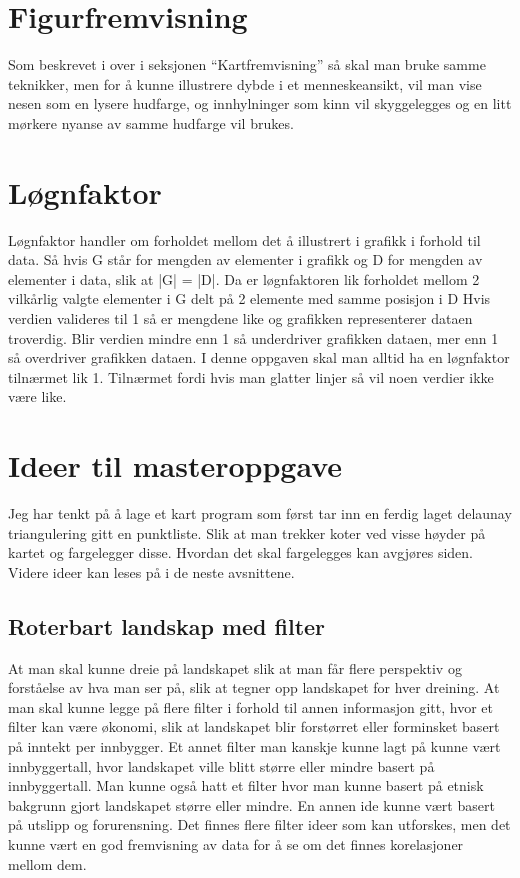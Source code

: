 \documentclass[norsk]{article}
\begin{document}
\section{Figurfremvisning}
Som beskrevet i over i seksjonen ``Kartfremvisning'' så skal man bruke samme
teknikker, men for å kunne illustrere dybde i et menneskeansikt, vil man
vise nesen som en lysere hudfarge, og innhylninger som kinn vil skyggelegges
og en litt mørkere nyanse av samme hudfarge vil brukes.

\section{Løgnfaktor}
Løgnfaktor handler om forholdet mellom det å illustrert i grafikk i forhold til
data. Så hvis G står for mengden av elementer i grafikk og D for mengden av
elementer i data, slik at |G| = |D|. Da er løgnfaktoren lik forholdet mellom
2 vilkårlig valgte elementer i G delt på 2 elemente med samme posisjon i D
Hvis verdien valideres til 1 så er mengdene like og grafikken representerer 
dataen troverdig. Blir verdien mindre enn 1 så underdriver grafikken dataen,
mer enn 1 så overdriver grafikken dataen.
I denne oppgaven skal man alltid ha en løgnfaktor tilnærmet lik 1. Tilnærmet
fordi hvis man glatter linjer så vil noen verdier ikke være like.  

\section{Ideer til masteroppgave}
Jeg har tenkt på å lage et kart program som først tar inn en ferdig laget 
delaunay triangulering gitt en punktliste. Slik at man trekker koter ved
visse høyder på kartet og fargelegger disse. Hvordan det skal fargelegges
kan avgjøres siden. Videre ideer kan leses på i de neste avsnittene.

\subsection{Roterbart landskap med filter}
At man skal kunne dreie på landskapet slik at man får flere perspektiv og
forståelse av hva man ser på, slik at tegner opp landskapet for hver 
dreining.
At man skal kunne legge på flere filter i forhold til annen informasjon gitt,
hvor et filter kan være økonomi, slik at landskapet blir forstørret eller 
forminsket basert på inntekt per innbygger.
Et annet filter man kanskje kunne lagt på kunne vært innbyggertall, hvor
landskapet ville blitt større eller mindre basert på innbyggertall.
Man kunne også hatt et filter hvor man kunne basert på etnisk bakgrunn
gjort landskapet større eller mindre.
En annen ide kunne vært basert på utslipp og forurensning. Det finnes flere
filter ideer som kan utforskes, men det kunne vært en god fremvisning av
data for å se om det finnes korelasjoner mellom dem.
\end{document}
